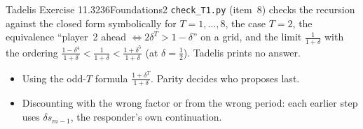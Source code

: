 \begin{exsol}{Tadelis Exercise 11.3}{236}{Foundations}{2}
\verify \texttt{check\_T1.py} (item~8) checks the recursion against the closed form symbolically for
$T = 1,\dots,8$, the case $T = 2$, the equivalence ``player~2 ahead $\iff 2\delta^T > 1-\delta$'' on a grid,
and the limit $\frac1{1+\delta}$ with the ordering $\frac{1-\delta^4}{1+\delta} < \frac1{1+\delta} <
\frac{1+\delta^5}{1+\delta}$ (at $\delta = \frac12$). Tadelis prints no answer.

\mistakes
\begin{itemize}
  \item Using the odd-$T$ formula $\frac{1 + \delta^T}{1 + \delta}$. Parity decides who proposes last.
  \item Discounting with the wrong factor or from the wrong period: each earlier step uses $\delta s_{m-1}$,
  the responder's own continuation.
\end{itemize}

\end{exsol}

